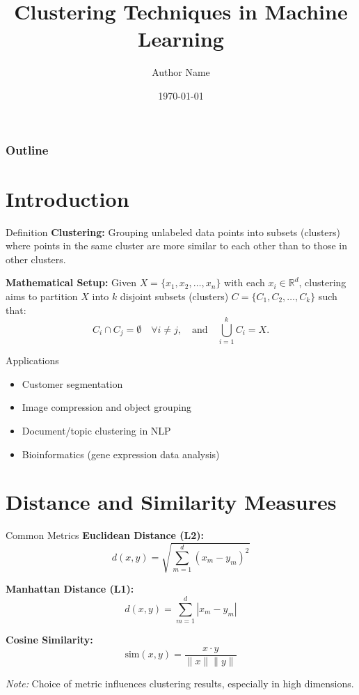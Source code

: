 \documentclass{beamer}
\title[Clustering Techniques in ML]{Clustering Techniques in Machine Learning}
\author{Author Name}
\institute{Institute/Organization}
\date{\today}
\begin{document}
\begin{frame}
    \titlepage
\end{frame}

\begin{frame}
    \frametitle{Outline}
    \tableofcontents
\end{frame}

\section{Introduction}
\begin{frame}{Definition}
    \textbf{Clustering:} Grouping unlabeled data points into subsets (clusters) where points in the same cluster are more similar to each other than to those in other clusters.
    
    \textbf{Mathematical Setup:}
    Given $X = \{x_1, x_2, \dots, x_n\}$ with each $x_i \in \mathbb{R}^d$, clustering aims to partition $X$ into $k$ disjoint subsets (clusters) $C = \{C_1, C_2, \dots, C_k\}$ such that:
    \[
        C_i \cap C_j = \emptyset \quad \forall i \neq j, \quad\text{and}\quad \bigcup_{i=1}^k C_i = X.
    \]
\end{frame}

\begin{frame}{Applications}
    \begin{itemize}
        \item Customer segmentation
        \item Image compression and object grouping
        \item Document/topic clustering in NLP
        \item Bioinformatics (gene expression data analysis)
    \end{itemize}
\end{frame}

\section{Distance and Similarity Measures}
\begin{frame}{Common Metrics}
    \textbf{Euclidean Distance (L2):}
    \[
        d(x,y) = \sqrt{\sum_{m=1}^{d}(x_m - y_m)^2}
    \]
    
    \textbf{Manhattan Distance (L1):}
    \[
        d(x,y) = \sum_{m=1}^{d}|x_m - y_m|
    \]
    
    \textbf{Cosine Similarity:}
    \[
        \text{sim}(x,y) = \frac{x \cdot y}{\|x\|\|y\|}
    \]
    
    \textit{Note:} Choice of metric influences clustering results, especially in high dimensions.
\end{frame}
\end{document}
